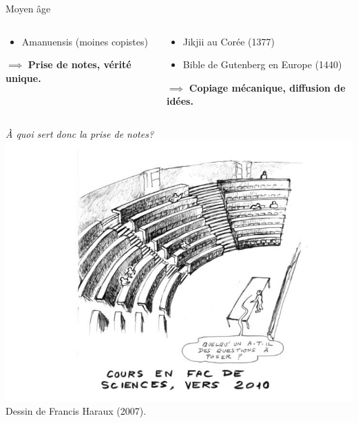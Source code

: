 \begin{frame}{Moyen âge}
\begin{columns}
\begin{column}{0.49\linewidth}
\begin{itemize}
			\item Amanuensis (moines copistes)
		\end{itemize}
		$\implies$ \textbf{Prise de notes, vérité unique.}
	\end{column}
	\begin{column}{0.49\linewidth}
		\begin{itemize}
			\item Jikjii au Corée (1377)
			\item Bible de Gutenberg en Europe (1440)
		\end{itemize}
		$\implies$ \textbf{Copiage mécanique, diffusion de idées.}
	\end{column}
\end{columns}
\end{frame}
\begin{frame}
\centering
\huge \emph{À quoi sert donc la prise de notes?}
\vfill
\centering
\includegraphics[height=0.5\paperheight]{../resources/illustrations/cours_magistral} \\
\vfill \hfill
\large Dessin de Francis Haraux (2007).\hfill \hfill
\end{frame}

